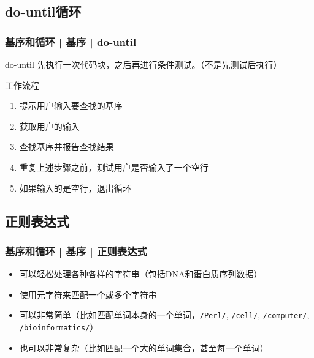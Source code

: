 \subsection{do-until循环}
\begin{frame}
  \frametitle{基序和循环 | 基序 | do-until}
  \begin{block}{do-until}
    先执行一次代码块，之后再进行条件测试。（不是先测试后执行）
  \end{block}
  \pause
  \begin{block}{工作流程}
    \begin{enumerate}
      \item 提示用户输入要查找的基序
      \item 获取用户的输入
      \item 查找基序并报告查找结果
      \item 重复上述步骤之前，测试用户是否输入了一个空行
      \item 如果输入的是空行，退出循环
    \end{enumerate}
  \end{block}
\end{frame}

\subsection{正则表达式}
\begin{frame}[fragile]
  \frametitle{基序和循环 | 基序 | 正则表达式}
  \begin{itemize}
    \item 可以轻松处理各种各样的字符串（包括DNA和蛋白质序列数据）
    \item 使用元字符来匹配一个或多个字符串
    \item 可以非常简单（比如匹配单词本身的一个单词，\verb|/Perl/|, \verb|/cell/|, \verb|/computer/|, \verb|/bioinformatics/|）
    \item 也可以非常复杂（比如匹配一个大的单词集合，甚至每一个单词）
  \end{itemize}
\end{frame}

